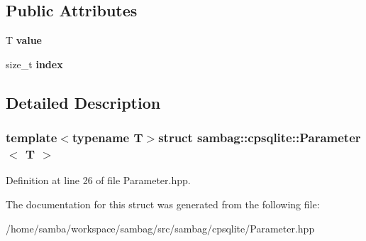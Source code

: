 \subsection*{Public Attributes}
\begin{DoxyCompactItemize}
\item 
\hypertarget{structsambag_1_1cpsqlite_1_1_parameter_a583a81c6aea0641db63392fe36e7e43a}{
T {\bfseries value}}
\label{structsambag_1_1cpsqlite_1_1_parameter_a583a81c6aea0641db63392fe36e7e43a}

\item 
\hypertarget{structsambag_1_1cpsqlite_1_1_parameter_a895e4e6e74b0fffad9b05fcf74e52107}{
size\_\-t {\bfseries index}}
\label{structsambag_1_1cpsqlite_1_1_parameter_a895e4e6e74b0fffad9b05fcf74e52107}

\end{DoxyCompactItemize}


\subsection{Detailed Description}
\subsubsection*{template$<$typename T$>$struct sambag::cpsqlite::Parameter$<$ T $>$}



Definition at line 26 of file Parameter.hpp.



The documentation for this struct was generated from the following file:\begin{DoxyCompactItemize}
\item 
/home/samba/workspace/sambag/src/sambag/cpsqlite/Parameter.hpp\end{DoxyCompactItemize}
